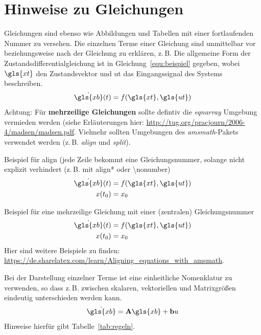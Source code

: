 \section{Hinweise zu Gleichungen}
\label{hinweise:gleichungen}
%
Gleichungen sind ebenso wie Abbildungen und Tabellen mit einer
fortlaufenden Nummer zu versehen. Die einzelnen Terme einer
Gleichung sind unmittelbar vor beziehungsweise nach der Gleichung
zu erklären, z.\,B. \glqq Die allgemeine Form der
Zustandsdifferentialgleichung ist in Gleichung~\ref{equ:beispiel} gegeben,
wobei $\gls{xt}$ den Zustandsvektor und \gls{ut} das
Eingangssignal des Systems beschreiben.\grqq
%
\begin{equation}
  \dot{\gls{xb}}(t) = f(\gls{xt}, \gls{ut})
  \label{equ:beispiel}
\end{equation}
%
Achtung: Für \textbf{mehrzeilige Gleichungen} sollte defintiv die \textit{eqnarray} Umgebung
vermieden werden (siehe Erläuterungen hier: \url{http://tug.org/pracjourn/2006-4/madsen/madsen.pdf}.
Vielmehr sollten Umgebungen des \textit{amsmath}-Pakets verwendet werden (z.\,B. \textit{align} und \textit{split}).

Beispiel für align (jede Zeile bekommt eine Gleichungsnummer, solange nicht explizit verhindert (z.\,B. mit align* oder \textbackslash nonumber)
\begin{align}
    \dot{\gls{xb}}(t) &= f(\gls{xt}, \gls{ut}) \\
    x(t_0) &= x_0
\end{align}

Beispiel für eine mehrzeilige Gleichung mit einer (zentralen) Gleichungsnummer
\begin{equation}
\begin{split}
    \dot{\gls{xb}}(t) &= f(\gls{xt}, \gls{ut}) \\
    x(t_0) &= x_0
\end{split}
\end{equation}
Hier sind weitere Beispiele zu finden: \sloppy\url{https://de.sharelatex.com/learn/Aligning_equations_with_amsmath}.


%
Bei der Darstellung einzelner Terme ist eine einheitliche
Nomenklatur zu verwenden, so dass z.\,B. zwischen skalaren,
vektoriellen und Matrixgrößen eindeutig unterschieden werden kann.
%
\begin{equation}
  \dot{\gls{xb}} = \mathbf{A} \gls{xb} + \mathbf{b} u
  \label{equ:beispiel2}
\end{equation}
%
Hinweise hierfür gibt Tabelle~\ref{tab:regeln}.

